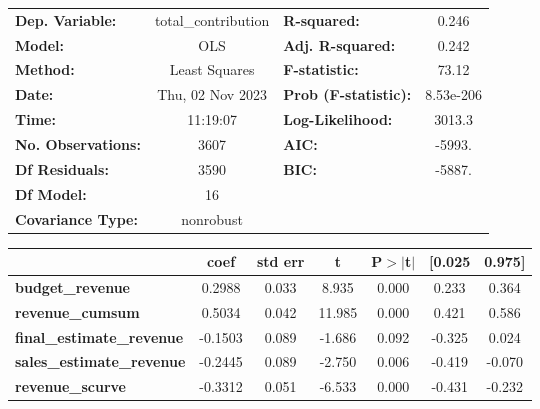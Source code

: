 \begin{center}
\begin{tabular}{lclc}
\toprule
\textbf{Dep. Variable:}                & total\_contribution & \textbf{  R-squared:         } &     0.246   \\
\textbf{Model:}                        &         OLS         & \textbf{  Adj. R-squared:    } &     0.242   \\
\textbf{Method:}                       &    Least Squares    & \textbf{  F-statistic:       } &     73.12   \\
\textbf{Date:}                         &   Thu, 02 Nov 2023  & \textbf{  Prob (F-statistic):} & 8.53e-206   \\
\textbf{Time:}                         &       11:19:07      & \textbf{  Log-Likelihood:    } &    3013.3   \\
\textbf{No. Observations:}             &          3607       & \textbf{  AIC:               } &    -5993.   \\
\textbf{Df Residuals:}                 &          3590       & \textbf{  BIC:               } &    -5887.   \\
\textbf{Df Model:}                     &            16       & \textbf{                     } &             \\
\textbf{Covariance Type:}              &      nonrobust      & \textbf{                     } &             \\
\bottomrule
\end{tabular}
\begin{tabular}{lcccccc}
                                       & \textbf{coef} & \textbf{std err} & \textbf{t} & \textbf{P$> |$t$|$} & \textbf{[0.025} & \textbf{0.975]}  \\
\midrule
\textbf{budget\_revenue}               &       0.2988  &        0.033     &     8.935  &         0.000        &        0.233    &        0.364     \\
\textbf{revenue\_cumsum}               &       0.5034  &        0.042     &    11.985  &         0.000        &        0.421    &        0.586     \\
\textbf{final\_estimate\_revenue}      &      -0.1503  &        0.089     &    -1.686  &         0.092        &       -0.325    &        0.024     \\
\textbf{sales\_estimate\_revenue}      &      -0.2445  &        0.089     &    -2.750  &         0.006        &       -0.419    &       -0.070     \\
\textbf{revenue\_scurve}               &      -0.3312  &        0.051     &    -6.533  &         0.000        &       -0.431    &       -0.232     \\

\end{tabular}
\end{center}
